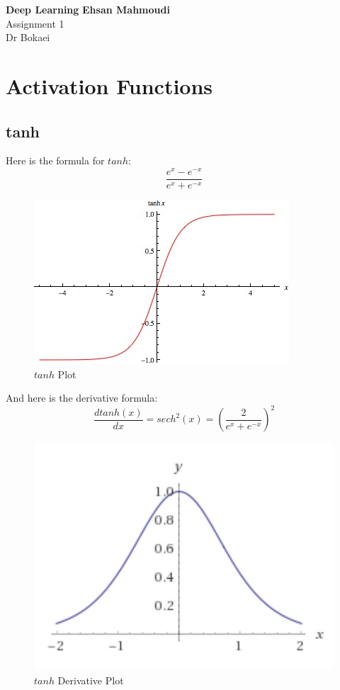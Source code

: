\documentclass[a4paper, 11pt, fleqn]{article}
\begin{document}
\noindent
\large\textbf{Deep Learning} \hfill \textbf{Ehsan Mahmoudi} \\
\normalsize Assignment 1 \hfill   \\
Dr Bokaei \hfill  \\

\section{Activation Functions}

\subsection{tanh}

Here is the formula for $tanh$: 
\begin{equation}
    \frac{e^x - e^{-x}}{e^x + e^{-x}}
\end{equation}

\begin{figure}[!htb]
    \centering
    \includegraphics{images/TanhReal.jpg}
    \caption{$tanh$ Plot}
\end{figure}

And here is the derivative formula: 
\begin{equation}
    \frac{d tanh(x)}{dx} = sech^2(x) = \left( \frac{2}{e^x + e^{-x}} \right)^2
\end{equation}

\begin{figure}[!htb]
    \centering
    \includegraphics{images/tanhderivative.JPG}
    \caption{$tanh$ Derivative Plot}
\end{figure}
\end{document}
